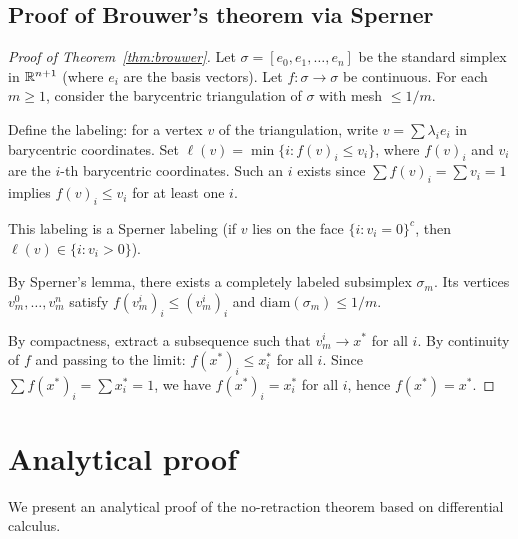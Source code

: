 \subsection{Proof of Brouwer's theorem via Sperner}

\begin{proof}[Proof of Theorem~\ref{thm:brouwer}]
Let $\sigma = [e_0, e_1, \ldots, e_n]$ be the standard simplex in $\mathbb{R}^{n+1}$
(where $e_i$ are the basis vectors). Let $f : \sigma \to \sigma$ be continuous.
For each $m \geq 1$, consider the barycentric triangulation of $\sigma$ with
mesh $\leq 1/m$.

Define the labeling: for a vertex $v$ of the triangulation, write
$v = \sum \lambda_i e_i$ in barycentric coordinates. Set
$\ell(v) = \min\{i : f(v)_i \leq v_i\}$, where $f(v)_i$ and $v_i$ are the
$i$-th barycentric coordinates. Such an $i$ exists since
$\sum f(v)_i = \sum v_i = 1$ implies $f(v)_i \leq v_i$ for at least one $i$.

This labeling is a Sperner labeling (if $v$ lies on the face
$\{i : v_i = 0\}^c$, then $\ell(v) \in \{i : v_i > 0\}$).

By Sperner's lemma, there exists a completely labeled subsimplex $\sigma_m$.
Its vertices $v_m^0, \ldots, v_m^n$ satisfy $f(v_m^i)_i \leq (v_m^i)_i$ and
$\mathrm{diam}(\sigma_m) \leq 1/m$.

By compactness, extract a subsequence such that $v_m^i \to x^*$ for all $i$.
By continuity of $f$ and passing to the limit: $f(x^*)_i \leq x^*_i$ for all
$i$. Since $\sum f(x^*)_i = \sum x^*_i = 1$, we have $f(x^*)_i = x^*_i$ for
all $i$, hence $f(x^*) = x^*$.
\end{proof}

\section{Analytical proof}

We present an analytical proof of the no-retraction theorem based on
differential calculus.

